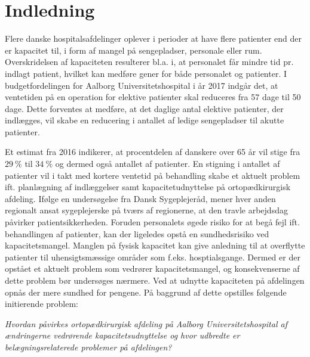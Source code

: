 \chapter{Indledning}


Flere danske hospitalsafdelinger oplever i perioder at have flere patienter end der er kapacitet til, i form af mangel på sengepladser, personale eller rum\cite{Company2013}. Overskridelsen af kapaciteten resulterer bl.a. i, at personalet får mindre tid pr. indlagt patient, hvilket kan medføre gener for både personalet og patienter.\cite{Kjeldsen2015} I budgetfordelingen for Aalborg Universitetshospital i år 2017 indgår det, at ventetiden på en operation for elektive patienter skal reduceres fra 57 dage til 50 dage\cite{Budget2016}. Dette forventes at medføre, at det daglige antal elektive patienter, der indlægges, vil skabe en reducering i antallet af ledige sengepladser til akutte patienter. 

Et estimat fra 2016 indikerer, at procentdelen af danskere over 65 år vil stige fra $29~\%$ til $34~\%$ og dermed også antallet af patienter\cite{RegionNord2016}. En stigning i antallet af patienter vil i takt med kortere ventetid på behandling skabe et aktuelt problem ift. planlægning af indlæggelser samt kapacitetudnyttelse på ortopædkirurgisk afdeling. Ifølge en undersøgelse fra Dansk Sygeplejeråd, mener hver anden regionalt ansat sygeplejerske på tværs af regionerne, at den travle arbejdsdag påvirker patientsikkerheden\cite{Kjeldsen2015}. Foruden personalets øgede risiko for at begå fejl ift. behandlingen af patienter, kan der ligeledes opstå en sundhedsrisiko ved kapacitetsmangel. Manglen på fysisk kapacitet kan give anledning til at overflytte patienter til uhensigtsmæssige områder som f.eks. hosptialsgange\cite{Madsen2014}. Dermed er der opstået et aktuelt problem som vedrører kapacitetsmangel, og konsekvenserne af dette problem bør undersøges nærmere. Ved at udnytte kapaciteten på afdelingen opnås der mere sundhed for pengene\cite{Company2013}. På baggrund af dette opstilles følgende initierende problem: 



\textit{Hvordan påvirkes ortopædkirurgisk afdeling på Aalborg Universitetshospital af ændringerne vedrørende kapacitetsudnyttelse og hvor udbredte er belægningsrelaterede problemer på afdelingen?} 


